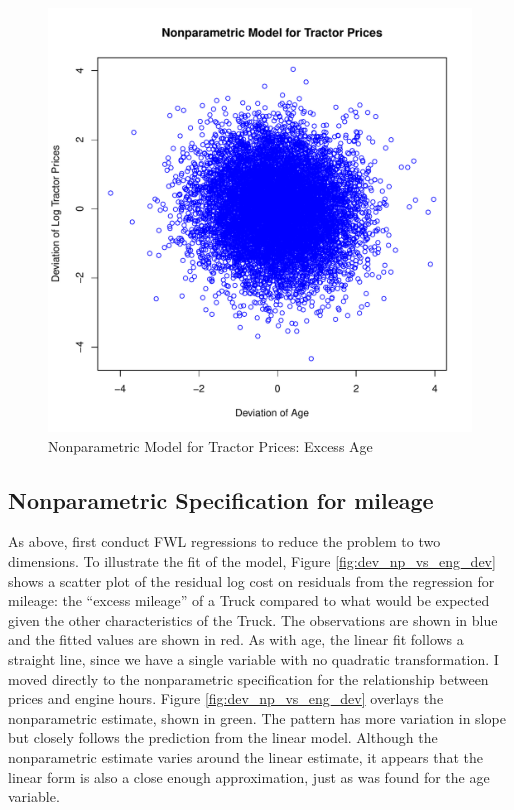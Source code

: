 \documentclass[11pt]{paper}
\begin{document}
\begin{figure}[h!]
  \centering
  \includegraphics[scale = 0.5, keepaspectratio=true]{../Figures/dev_np_vs_age_dev}
  \caption{Nonparametric Model for Tractor Prices: Excess Age} \label{fig:dev_np_vs_age_dev}
\end{figure}



\clearpage
\subsection{Nonparametric Specification for mileage}

As above, first conduct FWL regressions 
to reduce the problem to two dimensions. 
%
To illustrate the fit of the model, 
Figure \ref{fig:dev_np_vs_eng_dev}
shows a scatter plot 
of the residual log cost on 
residuals from the regression for mileage:
the ``excess mileage'' of a Truck compared to what would be 
expected given the other characteristics of the Truck. 
The observations are shown in blue
and the fitted values are shown in red.
As with age, the linear fit follows a straight line,
since we have a single variable with no
quadratic transformation.
% 
I moved directly to the nonparametric specification for 
the relationship between prices and engine hours.
Figure \ref{fig:dev_np_vs_eng_dev} 
overlays the nonparametric estimate, shown in green. 
The pattern has more variation in slope but 
closely follows the prediction from the linear model. 
Although the nonparametric estimate varies around the linear estimate,
it appears that the linear form
is also a close enough approximation, 
just as was found for the age variable.
\end{document}
